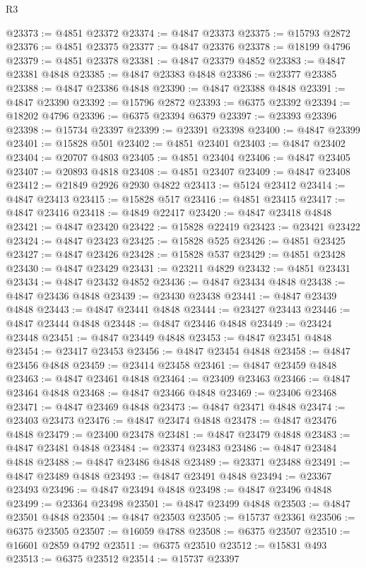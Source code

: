 \begin{lexlean}{R3}
\begin{coremodule}
@23373 := @4851 @23372
@23374 := @4847 @23373
@23375 := @15793 @2872
@23376 := @4851 @23375
@23377 := @4847 @23376
@23378 := @18199 @4796
@23379 := @4851 @23378
@23381 := @4847 @23379 @4852
@23383 := @4847 @23381 @4848
@23385 := @4847 @23383 @4848
@23386 := @23377 @23385
@23388 := @4847 @23386 @4848
@23390 := @4847 @23388 @4848
@23391 := @4847 @23390
@23392 := @15796 @2872
@23393 := @6375 @23392
@23394 := @18202 @4796
@23396 := @6375 @23394 @6379
@23397 := @23393 @23396
@23398 := @15734 @23397
@23399 := @23391 @23398
@23400 := @4847 @23399
@23401 := @15828 @501
@23402 := @4851 @23401
@23403 := @4847 @23402
@23404 := @20707 @4803
@23405 := @4851 @23404
@23406 := @4847 @23405
@23407 := @20893 @4818
@23408 := @4851 @23407
@23409 := @4847 @23408
@23412 := @21849 @2926 @2930 @4822
@23413 := @5124 @23412
@23414 := @4847 @23413
@23415 := @15828 @517
@23416 := @4851 @23415
@23417 := @4847 @23416
@23418 := @4849 @22417
@23420 := @4847 @23418 @4848
@23421 := @4847 @23420
@23422 := @15828 @22419
@23423 := @23421 @23422
@23424 := @4847 @23423
@23425 := @15828 @525
@23426 := @4851 @23425
@23427 := @4847 @23426
@23428 := @15828 @537
@23429 := @4851 @23428
@23430 := @4847 @23429
@23431 := @23211 @4829
@23432 := @4851 @23431
@23434 := @4847 @23432 @4852
@23436 := @4847 @23434 @4848
@23438 := @4847 @23436 @4848
@23439 := @23430 @23438
@23441 := @4847 @23439 @4848
@23443 := @4847 @23441 @4848
@23444 := @23427 @23443
@23446 := @4847 @23444 @4848
@23448 := @4847 @23446 @4848
@23449 := @23424 @23448
@23451 := @4847 @23449 @4848
@23453 := @4847 @23451 @4848
@23454 := @23417 @23453
@23456 := @4847 @23454 @4848
@23458 := @4847 @23456 @4848
@23459 := @23414 @23458
@23461 := @4847 @23459 @4848
@23463 := @4847 @23461 @4848
@23464 := @23409 @23463
@23466 := @4847 @23464 @4848
@23468 := @4847 @23466 @4848
@23469 := @23406 @23468
@23471 := @4847 @23469 @4848
@23473 := @4847 @23471 @4848
@23474 := @23403 @23473
@23476 := @4847 @23474 @4848
@23478 := @4847 @23476 @4848
@23479 := @23400 @23478
@23481 := @4847 @23479 @4848
@23483 := @4847 @23481 @4848
@23484 := @23374 @23483
@23486 := @4847 @23484 @4848
@23488 := @4847 @23486 @4848
@23489 := @23371 @23488
@23491 := @4847 @23489 @4848
@23493 := @4847 @23491 @4848
@23494 := @23367 @23493
@23496 := @4847 @23494 @4848
@23498 := @4847 @23496 @4848
@23499 := @23364 @23498
@23501 := @4847 @23499 @4848
@23503 := @4847 @23501 @4848
@23504 := @4847 @23503
@23505 := @15737 @23361
@23506 := @6375 @23505
@23507 := @16059 @4788
@23508 := @6375 @23507
@23510 := @16601 @2859 @4792
@23511 := @6375 @23510
@23512 := @15831 @493
@23513 := @6375 @23512
@23514 := @15737 @23397

\end{coremodule}
\end{lexlean}
